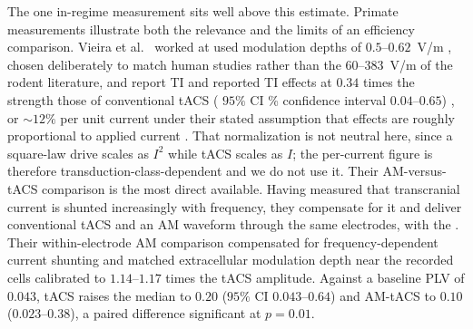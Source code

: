 \documentclass[11pt,a4paper]{article}
\providecommand{\DIFaddtex}[1]{{\protect\color{blue} \sf #1}} %
\providecommand{\DIFdeltex}[1]{{\protect\color{red} \scriptsize #1}} %
\providecommand{\DIFaddbegin}{} %
\providecommand{\DIFaddend}{} %
\providecommand{\DIFdelbegin}{} %
\providecommand{\DIFdelend}{} %
\providecommand{\DIFadd}[1]{\texorpdfstring{\DIFaddtex{#1}}{#1}} %
\providecommand{\DIFdel}[1]{\texorpdfstring{\DIFdeltex{#1}}{}} %
\begin{document}
\DIFdelbegin \DIFdel{The one in-regime measurement sits well above this estimate. }\DIFdelend \DIFaddbegin \DIFadd{Primate measurements illustrate both the relevance and the limits of an efficiency
comparison. }\DIFaddend Vieira et al.\ \DIFdelbegin \DIFdel{worked at
}\DIFdelend \DIFaddbegin \DIFadd{\cite{vieira2024} used }\DIFaddend modulation depths of
$0.5$--$0.62$~V/m \DIFdelbegin \DIFdel{, chosen deliberately to match human studies rather
than the $60$--$383$~V/m of the rodent literature, and report TI }\DIFdelend \DIFaddbegin \DIFadd{and reported TI effects }\DIFaddend at $0.34$ times \DIFdelbegin \DIFdel{the
strength }\DIFdelend \DIFaddbegin \DIFadd{those }\DIFaddend of conventional
tACS (\DIFdelbegin \DIFdel{$95\%$ CI }\DIFdelend \DIFaddbegin \DIFadd{95\% confidence interval }\DIFaddend $0.04$--$0.65$)\DIFdelbegin \DIFdel{, or $\sim 12\%$ per unit current
under their stated assumption that effects are roughly proportional to applied current
\cite{vieira2024}. That normalization is not neutral here, since a square-law drive scales
as $I^2$ while tACS scales as $I$; the per-current figure is therefore
transduction-class-dependent and we do not use it. Their AM-versus-tACS comparison
is the
most direct available. Having measured that transcranial current is shunted increasingly
with frequency, they compensate for it and deliver conventional tACS and an AM waveform
through the same electrodes, with the }\DIFdelend \DIFaddbegin \DIFadd{. Their within-electrode AM comparison
compensated for frequency-dependent current shunting and matched extracellular
}\DIFaddend modulation depth near the recorded cells\DIFdelbegin \DIFdel{calibrated
to $1.14$--$1.17$ times the tACS amplitude. Against a baseline PLV of $0.043$, tACS raises
the median to $0.20$ ($95\%$ CI $0.043$--$0.64$) and AM-tACS to $0.10$
($0.023$--$0.38$), a paired difference significant at $p=0.01$}\DIFdelend . \DIFdelbegin %
\end{document}
